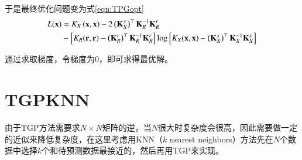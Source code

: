 于是最终优化问题变为式\ref{eqn:TPGopt}
\begin{align}
 L(\textbf{x}) &= K_X\left(\textbf{x},\textbf{x}\right)-2\left(\textbf{K}_X^x\right)^\top \textbf{K}_R^{-1} \textbf{K}_R^r \notag\\
               &- \left[K_R(\textbf{r},\textbf{r}) - \left(\textbf{K}_R^r\right)^\top \textbf{K}_R^{-1} \textbf{K}_R^r\right] \log\left[K_X(\textbf{x},\textbf{x}) - \left(\textbf{K}_X^x\right)^\top \textbf{K}_X^{-1} \textbf{K}_X^x\right] \label{eqn:TPGopt}
 \end{align}

通过求取梯度，令梯度为0，即可求得最优解。

\section{TGPKNN}

由于TGP方法需要求$N\times N$矩阵的逆，当$N$很大时复杂度会很高，因此需要做一定的近似来降低复杂度，在这里考虑用KNN（$k$ nearest neighbors）方法先在$N$个数据中选择$k$个和待预测数据最接近的，然后再用TGP来实现。
